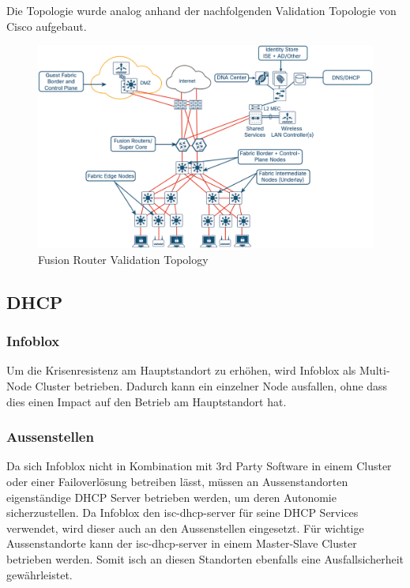 Die Topologie wurde analog anhand der nachfolgenden Validation Topologie von Cisco aufgebaut.
\begin{figure}[H]
	\centering
	\includegraphics[width=1\linewidth]{img/Absicherung/FusionRouter-ValidationTopology}
	\caption{Fusion Router Validation Topology \cite{sda-deploymentguide-oct2018} }
	\label{fig:Fusion Router Validation Topology}
\end{figure}


\subsection{DHCP}

\subsubsection{Infoblox}
Um die Krisenresistenz am Hauptstandort zu erhöhen, wird Infoblox als Multi-Node Cluster betrieben. Dadurch kann ein einzelner Node ausfallen, ohne dass dies einen Impact auf den Betrieb am Hauptstandort hat. 

\subsubsection{Aussenstellen}
Da sich Infoblox nicht in Kombination mit 3rd Party Software in einem Cluster oder einer Failoverlösung betreiben lässt, müssen an Aussenstandorten eigenständige DHCP Server betrieben werden, um deren Autonomie sicherzustellen. Da Infoblox den isc-dhcp-server für seine DHCP Services verwendet, wird dieser auch an den Aussenstellen eingesetzt. 
Für wichtige Aussenstandorte kann der isc-dhcp-server in einem Master-Slave Cluster betrieben werden. Somit isch an diesen Standorten ebenfalls eine Ausfallsicherheit gewährleistet.

